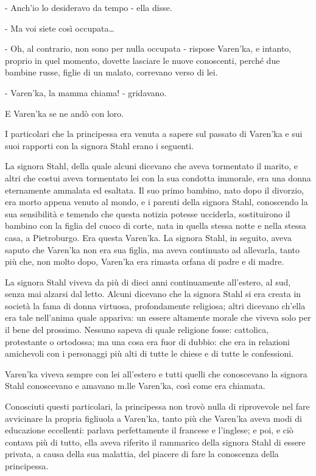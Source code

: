 - Anch'io lo desideravo da tempo - ella disse. 

- Ma voi siete così occupata\ldots{} 

- Oh, al contrario, non sono per nulla occupata - rispose Varen'ka, e intanto, proprio in quel momento, dovette lasciare le nuove conoscenti, perché due bambine russe, figlie di un malato, correvano verso di lei. 

- Varen'ka, la mamma chiama! - gridavano. 

E Varen'ka se ne andò con loro. 

I particolari che la principessa era venuta a sapere sul passato di Varen'ka e sui suoi rapporti con la signora Stahl erano i seguenti. 

La signora Stahl, della quale alcuni dicevano che aveva tormentato il marito, e altri che costui aveva tormentato lei con la sua condotta immorale, era una donna eternamente ammalata ed esaltata. Il suo primo bambino, nato dopo il divorzio, era morto appena venuto al mondo, e i parenti della signora Stahl, conoscendo la sua sensibilità e temendo che questa notizia potesse ucciderla, sostituirono il bambino con la figlia del cuoco di corte, nata in quella stessa notte e nella stessa casa, a Pietroburgo. Era questa Varen'ka. La signora Stahl, in seguito, aveva saputo che Varen'ka non era sua figlia, ma aveva continuato ad allevarla, tanto più che, non molto dopo, Varen'ka era rimasta orfana di padre e di madre. 

La signora Stahl viveva da più di dieci anni continuamente all'estero, al sud, senza mai alzarsi dal letto. Alcuni dicevano che la signora Stahl si era creata in società la fama di donna virtuosa, profondamente religiosa; altri dicevano ch'ella era tale nell'anima quale appariva: un essere altamente morale che viveva solo per il bene del prossimo. Nessuno sapeva di quale religione fosse: cattolica, protestante o ortodossa; ma una cosa era fuor di dubbio: che era in relazioni amichevoli con i personaggi più alti di tutte le chiese e di tutte le confessioni. 

Varen'ka viveva sempre con lei all'estero e tutti quelli che conoscevano la signora Stahl conoscevano e amavano m.lle Varen'ka, così come era chiamata. 

Conosciuti questi particolari, la principessa non trovò nulla di riprovevole nel fare avvicinare la propria figliuola a Varen'ka, tanto più che Varen'ka aveva modi di educazione eccellenti: parlava perfettamente il francese e l'inglese; e poi, e ciò contava più di tutto, ella aveva riferito il rammarico della signora Stahl di essere privata, a causa della sua malattia, del piacere di fare la conoscenza della principessa. 


